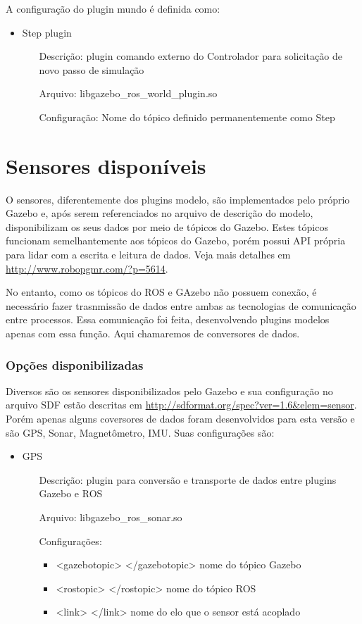 A configuração do plugin mundo é definida como:

\begin{itemize}
\item Step plugin
\begin{itemize}
\item[Descrição:] plugin comando externo do Controlador para solicitação de novo passo de simulação
\item[Arquivo:] libgazebo\_ros\_world\_plugin.so
\item[Configuração:] Nome do tópico definido permanentemente como Step
\end{itemize}
\end{itemize}

\section{Sensores disponíveis}

O sensores, diferentemente dos plugins modelo, são implementados pelo próprio Gazebo e, após serem referenciados no arquivo de descrição do modelo, disponibilizam os seus dados por meio de tópicos do Gazebo. Estes tópicos funcionam semelhantemente aos tópicos do Gazebo, porém possui API própria para lidar com a escrita e leitura de dados. Veja mais detalhes em \url{http://www.robopgmr.com/?p=5614}.

No entanto, como os tópicos do ROS e GAzebo não possuem conexão, é necessário fazer trasnmissão de dados entre ambas as tecnologias de comunicação entre processos. Essa comunicação foi feita, desenvolvendo plugins modelos apenas com essa função. Aqui chamaremos de conversores de dados.

\subsubsection{Opções disponibilizadas}

Diversos são os sensores disponibilizados pelo Gazebo e sua configuração no arquivo SDF estão descritas em \url{http://sdformat.org/spec?ver=1.6&elem=sensor}. Porém apenas alguns coversores de dados foram desenvolvidos para esta versão e são GPS, Sonar, Magnetômetro, IMU. Suas configurações são:

\begin{itemize}
\item GPS
\begin{itemize}
\item[Descrição:] plugin para conversão e transporte de dados entre plugins Gazebo e ROS
\item[Arquivo:] libgazebo\_ros\_sonar.so
\item[Configurações:]
\begin{itemize}
\item <gazebotopic> </gazebotopic> nome do tópico Gazebo
\item <rostopic> </rostopic> nome do tópico ROS
\item <link> </link> nome do elo que o sensor está acoplado
\end{itemize}
\end{itemize}
\end{itemize}

